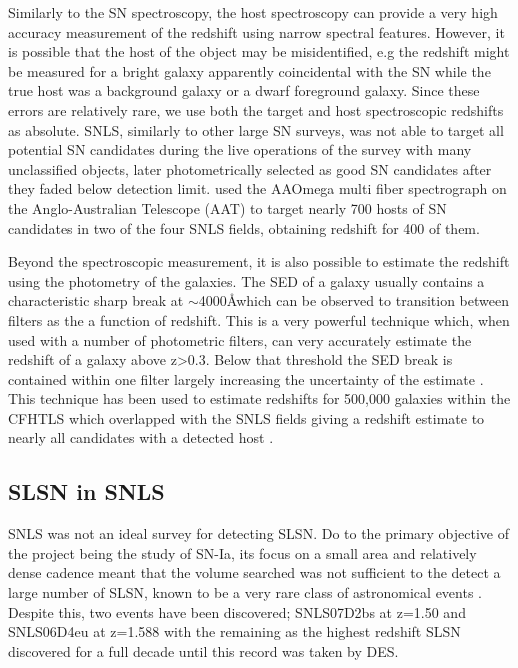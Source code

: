 Similarly to the SN spectroscopy, the host spectroscopy can provide a very high accuracy measurement of the redshift using narrow spectral features. However, it is possible that the host of the object may be misidentified, e.g the redshift might be measured for a bright galaxy apparently coincidental with the SN while the true host was a background galaxy or a dwarf foreground galaxy. Since these errors are relatively rare, we use both the target and host spectroscopic redshifts as absolute. SNLS, similarly to other large SN surveys, was not able to target all potential SN candidates during the live operations of the survey with many unclassified objects, later photometrically selected as good SN candidates after they faded below detection limit. \citet{Lidman2012} used the AAOmega multi fiber spectrograph on the Anglo-Australian Telescope (AAT) to target nearly 700 hosts of SN candidates in two of the four SNLS fields, obtaining redshift for 400 of them.

Beyond the spectroscopic measurement, it is also possible to estimate the redshift using the photometry of the galaxies. The SED of a galaxy usually contains a characteristic sharp break at $\sim$4000\AA which can be observed to transition between filters as the a function of redshift. This is a very powerful technique which, when used with a number of photometric filters, can very accurately estimate the redshift of a galaxy above z>0.3. Below that threshold the SED break is contained within one filter largely increasing the uncertainty of the estimate \citep{Connolly1995}. This technique has been used to estimate redshifts for 500,000 galaxies within the CFHTLS which overlapped with the SNLS fields giving a redshift estimate to nearly all candidates with a detected host \citep{Ilbert2006}.

\subsection{SLSN in SNLS}
SNLS was not an ideal survey for detecting SLSN. Do to the primary objective of the project being the study of SN-Ia, its focus on a small area and relatively dense cadence meant that the volume searched was not sufficient to the detect a large number of SLSN, known to be a very rare class of astronomical events \citep{Cooke2012,Prajs2016,Quimby2013}. Despite this, two events have been discovered; SNLS07D2bs at z=1.50 and SNLS06D4eu at z=1.588 with the remaining as the highest redshift SLSN discovered for a full decade until this record was taken by DES.

